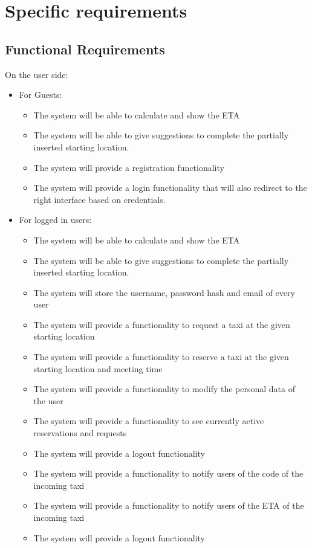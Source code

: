 \documentclass{article}
\begin{document}
\section{Specific requirements}
\subsection{Functional Requirements}
On the user side:\@
\begin{itemize}
	\item For Guests:
		\begin{itemize}
			\item The system will be able to calculate and show the ETA\@ 
			\item The system will be able to give suggestions to complete the partially inserted starting location.\@ 
			\item The system will provide a registration functionality 
			\item The system will provide a login functionality that will also redirect to the right interface based on credentials.
		\end{itemize}
	\item For logged in users:
		\begin{itemize}
			\item The system will be able to calculate and show the ETA\@ 
			\item The system will be able to give suggestions to complete the partially inserted starting location.\@ 
			\item The system will store the username, password hash and email of every user
			\item The system will provide a functionality to request a taxi at the given starting location 
			\item The system will provide a functionality to reserve a taxi at the given starting location and meeting time
			\item The system will provide a functionality to modify the personal data of the user
			\item The system will provide a functionality to see currently active reservations and requests
			\item The system will provide a logout functionality
			\item The system will provide a functionality to notify users of the code of the incoming taxi
			\item The system will provide a functionality to notify users of the ETA of the incoming taxi
			\item The system will provide a logout functionality

\end{itemize}
\end{itemize}
\end{document}

